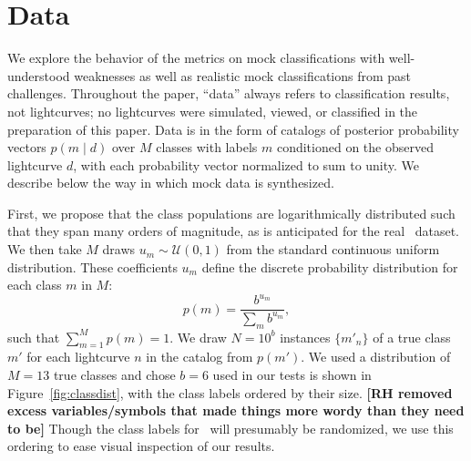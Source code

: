 \section{Data}
\label{sec:data}

We explore the behavior of the metrics on mock classifications with well-understood weaknesses as well as realistic mock classifications from past challenges.
Throughout the paper, ``data'' always refers to classification results, not lightcurves; no lightcurves were simulated, viewed, or classified in the preparation of this paper.
Data is in the form of catalogs of posterior probability vectors $p(m \mid d)$ over $M$ classes with labels $m$ conditioned on the observed lightcurve $d$, with each probability vector normalized to sum to unity.
We describe below the way in which mock data is synthesized.

First, we propose that the class populations are logarithmically distributed such that they span many orders of magnitude, as is anticipated for the real \lsst\ dataset.
We then take $M$ draws $u_{m} \sim \mathcal{U}(0, 1)$ from the standard continuous uniform distribution. These coefficients $u_m$ define the discrete probability distribution for each class $m$ in $M:$ \begin{equation}p(m) = \frac{b^{u_{m}}}{\sum_{m} b^{u_{m}}},\end{equation} such that $\sum_{m=1}^{M} p(m) = 1$.
We draw $N = 10^{b}$ instances $\{m'_{n}\}$ of a true class $m'$ for each lightcurve $n$ in the catalog from $p(m')$.
We used a distribution of $M=13$ true classes and chose $b=6$ used in our tests is shown in Figure~\ref{fig:classdist}, with the class labels ordered by their size. \textbf{[RH removed excess variables/symbols that made things more wordy than they need to be]}
Though the class labels for \plasticc\ will presumably be randomized, we use this ordering to ease visual inspection of our results.

